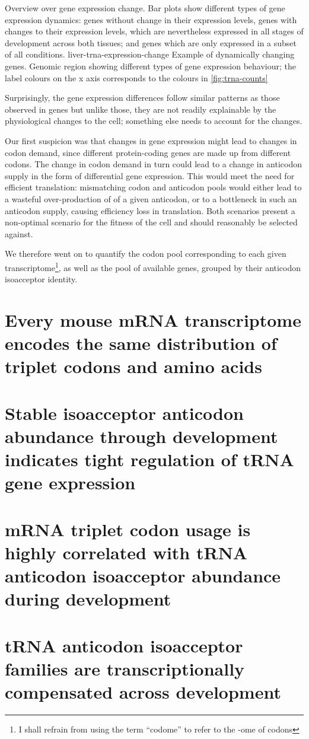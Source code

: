     {Overview over \trna gene expression change.}
    {Bar plots show different types of \trna gene expression dynamics: \trna
    genes without change in their expression levels, \trna genes with changes to
    their expression levels, which are nevertheless expressed in all stages of
    development across both tissues; and \trna genes which are only expressed in
    a subset of all conditions.}
    {liver-trna-expression-change}
    {Example of dynamically changing \trna genes.}
    {Genomic region showing different types of \trna gene expression behaviour;
    the label colours on the x axis corresponds to the colours in
    \cref{fig:trna-counts}}

Surprisingly, the \trna gene expression differences follow similar patterns as
those observed in \mrna genes  but unlike those, they are not
readily explainable by the physiological changes to the cell; something else
needs to account for the changes.

Our first suspicion was that changes in \mrna gene expression might lead to
changes in codon demand, since different protein-coding genes are made up from
different codons. The change in codon demand in turn could lead to a change in
anticodon supply in the form of differential \trna gene expression. This would
meet the need for efficient translation: mismatching codon and anticodon pools
would either lead to a wasteful over-production of \trna[s] of a given
anticodon, or to a bottleneck in such an anticodon supply, causing efficiency
loss in translation. Both scenarios present a non-optimal scenario for the
fitness of the cell and should reasonably be selected against.

We therefore went on to quantify the codon pool corresponding to each given
transcriptome\footnote{I shall refrain from using the term “codome” to refer to
the -ome of codons}, as well as the pool of available \trna genes, grouped by
their anticodon isoacceptor identity.


\section{Every mouse mRNA transcriptome encodes the same distribution of
triplet codons and amino acids}

\section{Stable isoacceptor anticodon abundance through development indicates
tight regulation of tRNA gene expression}

\section{mRNA triplet codon usage is highly correlated with tRNA anticodon
isoacceptor abundance during development}

\section{tRNA anticodon isoacceptor families are transcriptionally compensated
across development}

